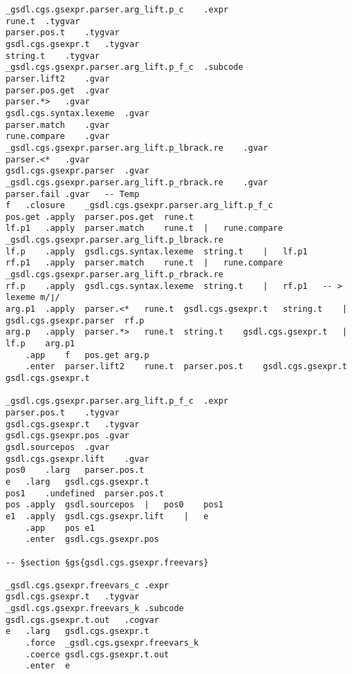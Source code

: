 \documentclass{report}
\begin{document}
\begin{verbatim}
_gsdl.cgs.gsexpr.parser.arg_lift.p_c	.expr
rune.t	.tygvar
parser.pos.t	.tygvar
gsdl.cgs.gsexpr.t	.tygvar
string.t	.tygvar
_gsdl.cgs.gsexpr.parser.arg_lift.p_f_c	.subcode
parser.lift2	.gvar
parser.pos.get	.gvar
parser.*>	.gvar
gsdl.cgs.syntax.lexeme	.gvar
parser.match	.gvar
rune.compare	.gvar
_gsdl.cgs.gsexpr.parser.arg_lift.p_lbrack.re	.gvar
parser.<*	.gvar
gsdl.cgs.gsexpr.parser	.gvar
_gsdl.cgs.gsexpr.parser.arg_lift.p_rbrack.re	.gvar
parser.fail	.gvar	-- Temp
f	.closure	_gsdl.cgs.gsexpr.parser.arg_lift.p_f_c
pos.get	.apply	parser.pos.get	rune.t
lf.p1	.apply	parser.match	rune.t	|	rune.compare	_gsdl.cgs.gsexpr.parser.arg_lift.p_lbrack.re
lf.p	.apply	gsdl.cgs.syntax.lexeme	string.t	|	lf.p1
rf.p1	.apply	parser.match	rune.t	|	rune.compare	_gsdl.cgs.gsexpr.parser.arg_lift.p_rbrack.re
rf.p	.apply	gsdl.cgs.syntax.lexeme	string.t	|	rf.p1	-- > lexeme m/⌋/
arg.p1	.apply	parser.<*	rune.t	gsdl.cgs.gsexpr.t	string.t	|	gsdl.cgs.gsexpr.parser	rf.p
arg.p	.apply	parser.*>	rune.t	string.t	gsdl.cgs.gsexpr.t	|	lf.p	arg.p1
	.app	f	pos.get	arg.p
	.enter	parser.lift2	rune.t	parser.pos.t	gsdl.cgs.gsexpr.t	gsdl.cgs.gsexpr.t

_gsdl.cgs.gsexpr.parser.arg_lift.p_f_c	.expr
parser.pos.t	.tygvar
gsdl.cgs.gsexpr.t	.tygvar
gsdl.cgs.gsexpr.pos	.gvar
gsdl.sourcepos	.gvar
gsdl.cgs.gsexpr.lift	.gvar
pos0	.larg	parser.pos.t
e	.larg	gsdl.cgs.gsexpr.t
pos1	.undefined	parser.pos.t
pos	.apply	gsdl.sourcepos	|	pos0	pos1
e1	.apply	gsdl.cgs.gsexpr.lift	|	e
	.app	pos	e1
	.enter	gsdl.cgs.gsexpr.pos

-- §section §gs{gsdl.cgs.gsexpr.freevars}

_gsdl.cgs.gsexpr.freevars_c	.expr
gsdl.cgs.gsexpr.t	.tygvar
_gsdl.cgs.gsexpr.freevars_k	.subcode
gsdl.cgs.gsexpr.t.out	.cogvar
e	.larg	gsdl.cgs.gsexpr.t
	.force	_gsdl.cgs.gsexpr.freevars_k
	.coerce	gsdl.cgs.gsexpr.t.out
	.enter	e


\end{verbatim}
\end{document}
